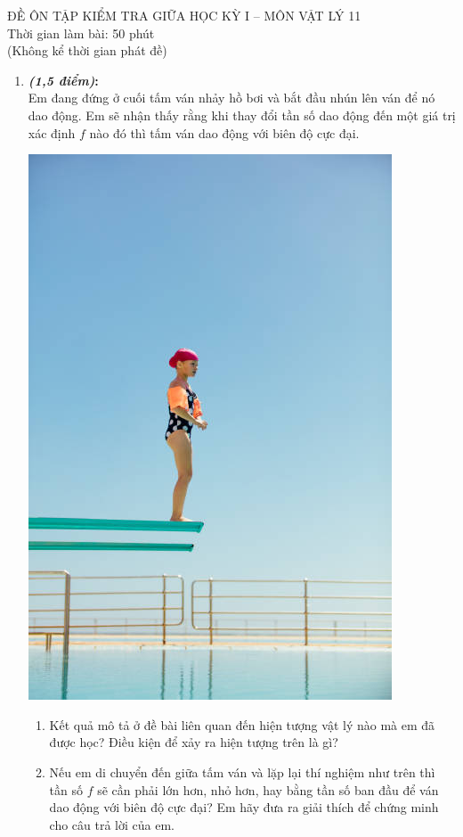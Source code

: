 \begin{center}
	ĐỀ ÔN TẬP KIỂM TRA GIỮA HỌC KỲ I – MÔN VẬT LÝ 11\\
	Thời gian làm bài: 50 phút \\
	(Không kể thời gian phát đề)\\
\end{center}
\begin{enumerate}[label=\bfseries Câu \arabic*]
	\item \textbf{\textit{(1,5 điểm)}:}\\ Em đang đứng ở cuối tấm ván nhảy hồ bơi và bắt đầu nhún lên ván để nó dao động. Em sẽ nhận thấy rằng khi thay đổi tần số dao động đến một giá trị xác định $f$ nào đó thì tấm ván dao động với biên độ cực đại. 
	\begin{center}
		\includegraphics[width=0.25\linewidth]{../figs/D11-4-4}
	\end{center}
	\begin{enumerate}[label=\alph*)]
		\item Kết quả mô tả ở đề bài liên quan đến hiện tượng vật lý nào mà em đã được học? Điều kiện để xảy ra hiện tượng trên là gì?
		\item Nếu em di chuyển đến giữa tấm ván và lặp lại thí nghiệm như trên thì tần số $f$ sẽ cần phải lớn hơn, nhỏ hơn, hay bằng tần số ban đầu để ván dao động với biên độ cực đại? Em hãy đưa ra giải thích để chứng minh cho câu trả lời của em.
	\end{enumerate}
\end{enumerate}
